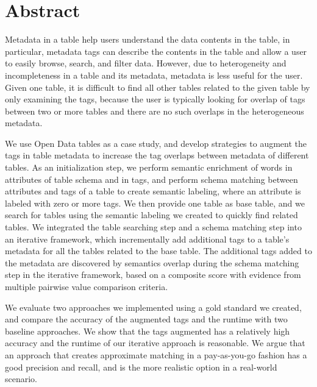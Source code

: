 
\chapter{Abstract}

Metadata in a table help users understand the data contents in the table, in particular, metadata tags can describe the contents in the table and allow a user to easily browse, search, and filter data. However, due to heterogeneity and incompleteness in a table and its metadata, metadata is less useful for the user. Given one table, it is difficult to find all other tables related to the given table by only examining the tags, because the user is typically looking for overlap of tags between two or more tables and there are no such overlaps in the heterogeneous metadata.

We use Open Data tables as a case study, and develop strategies to augment the tags in table metadata to increase the tag overlaps between metadata of different tables. As an initialization step, we perform semantic enrichment of words in attributes of table schema and in tags, and perform schema matching between attributes and tags of a table to create semantic labeling, where an attribute is labeled with zero or more tags. We then provide one table as base table, and we search for tables using the semantic labeling we created to quickly find related tables. We integrated the table searching step and a schema matching step into an iterative framework, which incrementally add additional tags to a table’s metadata for all the tables related to the base table. The additional tags added to the metadata are discovered by semantics overlap during the schema matching step in the iterative framework, based on a composite score with evidence from multiple pairwise value comparison criteria.

We evaluate two approaches we implemented using a gold standard we created, and compare the accuracy of the augmented tags and the runtime with two baseline approaches. We show that the
tags augmented has a relatively high accuracy and the runtime of our iterative approach is reasonable. We argue that an approach that creates approximate matching in a pay-as-you-go fashion has a good precision and recall, and is the more realistic option in a real-world scenario.
\endinput